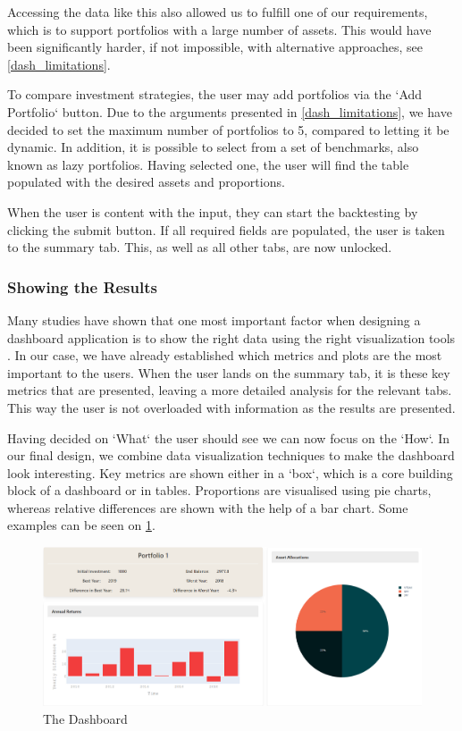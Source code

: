 \documentclass[main.tex]{subfiles}
\begin{document}
Accessing the data like this also allowed us to fulfill one of our requirements, which is to support portfolios with a large number of assets. This would have been significantly harder, if not impossible, with alternative approaches, see \ref{dash_limitations}.

To compare investment strategies, the user may add portfolios via the `Add Portfolio` button. Due to the arguments presented in \ref{dash_limitations}, we have decided to set the maximum number of portfolios to 5, compared to letting it be dynamic. In addition, it is possible to select from a set of benchmarks, also known as lazy portfolios. Having selected one, the user will find the table populated with the desired assets and proportions. 

When the user is content with the input, they can start the backtesting by clicking the submit button. If all required fields are populated, the user is taken to the summary tab. This, as well as all other tabs, are now unlocked.

\subsubsection*{Showing the Results}

Many studies have shown that one most important factor when designing a dashboard application is to show the right data using the right visualization tools \cite{dashboard_design1} \cite{dashboard_design2}. In our case, we have already established which metrics and plots are the most important to the users. When the user lands on the summary tab, it is these key metrics that are presented, leaving a more detailed analysis for the relevant tabs. This way the user is not overloaded with information as the results are presented. 

Having decided on `What` the user should see we can now focus on the `How`. In our final design, we combine data visualization techniques to make the dashboard look interesting. Key metrics are shown either in a `box`, which is a core building block of a dashboard or in tables. Proportions are visualised using pie charts, whereas relative differences are shown with the help of a bar chart. Some examples can be seen on \figurename{\ref{dashboard}}.

\begin{figure}[H]
   \centering
   \includegraphics[width=\textwidth]{04Design/04Pictures/dashboard.png}
   \caption{The Dashboard}
   \label{dashboard}
\end{figure}
\end{document}
